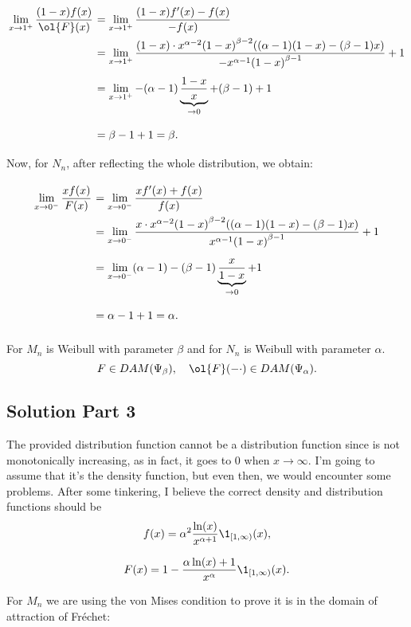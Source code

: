 \[ \everymath{\displaystyle}
\arraycolsep=1.8pt\def\arraystretch{2.5}
\begin{array}{rl}
    \lim_{x\to 1^+} \frac{(1-x)f(x)}{\ol{F}(x)} & = \lim_{x\to 1^+} \frac{(1-x)f'(x)- f(x)}{-f(x)}\\
    & = \lim_{x\to 1^+} \frac{(1-x) \cdot x^{\alpha-2}{(1-x)}^{\beta-2}((\alpha-1)(1-x)-(\beta-1)x)}{-x^{\alpha - 1}{(1-x)}^{\beta-1}} + 1\\
    & = \lim_{x\to 1^+} -(\alpha-1)\underbrace{\frac{1-x}{x}}_{\to 0}+(\beta-1) + 1\\
    & = \beta - 1 + 1 = \beta.
\end{array} \]
Now, for $N_n$, after reflecting the whole distribution, we obtain:
\[ \everymath{\displaystyle}
\arraycolsep=1.8pt\def\arraystretch{2.5}
\begin{array}{rl}
    \lim_{x\to 0^-} \frac{x f(x)}{F(x)}& = \lim_{x\to 0^-} \frac{xf'(x) + f(x)}{f(x)}\\
    & = \lim_{x\to 0^-} \frac{x \cdot x^{\alpha-2}{(1-x)}^{\beta-2}((\alpha-1)(1-x)-(\beta-1)x)}{x^{\alpha - 1}{(1-x)}^{\beta-1}} + 1\\
    & = \lim_{x\to 0^-} (\alpha - 1) - (\beta -1)\underbrace{\frac{x}{1-x}}_{\to 0} + 1\\
    & = \alpha - 1 + 1 = \alpha.
\end{array} \]

For $M_n$ is Weibull with parameter $\beta$ and for $N_n$ is Weibull with parameter $\alpha$.
\[ F \in DAM(\Psi_\beta),\hspace*{1em} \ol{F}(-\cdot) \in DAM(\Psi_\alpha). \]

\subsection*{Solution Part 3}

The provided distribution function cannot be a distribution function since is not monotonically increasing, as in fact, it goes to 0 when $x \to \infty$. I'm going to assume that it's the density function, but even then, we would encounter some problems. After some tinkering, I believe the correct density and distribution functions should be
\[ f(x) = \alpha^2 \frac{\ln(x)}{x^{\alpha+1}} \1_{[1,\infty)}(x), \]

\[ F(x) = 1- \frac{\alpha\ln(x) + 1}{x^{\alpha}}\1_{[1,\infty)}(x). \]

For $M_n$ we are using the von Mises condition to prove it is in the domain of attraction of Fréchet:

